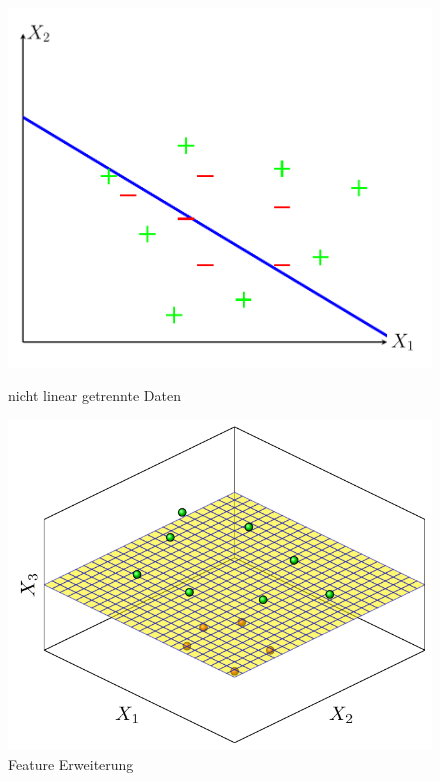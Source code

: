 \documentclass[
]{article}
\begin{document}
\begin{figure}[h]
    \centering
    \begin{minipage}{0.45\textwidth} 
        \centering
        \includegraphics[width=\textwidth,trim=0.5cm 0.5cm 0.5cm 0.5cm]{Images/nonlinearseperable.pdf} 
        \caption{nicht linear getrennte Daten}
        \label{fig:nonlinearsep}
    \end{minipage}\hfill
    \begin{minipage}{0.45\textwidth} 
        \centering
        \includegraphics[width=\textwidth,trim=0.5cm 0.5cm 0.5cm 0.5cm]{Images/featurexpansion.pdf}
        \caption{Feature Erweiterung}
        \label{fig:featurexten}
    \end{minipage}
\end{figure}
\end{document}
